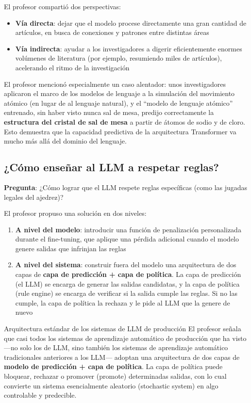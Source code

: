 \documentclass[a4paper]{article}
\begin{document}
El profesor compartió dos perspectivas:
\begin{itemize}
    \item \textbf{Vía directa}: dejar que el modelo procese directamente una gran cantidad de artículos, en busca de conexiones y patrones entre distintas áreas
    \item \textbf{Vía indirecta}: ayudar a los investigadores a digerir eficientemente enormes volúmenes de literatura (por ejemplo, resumiendo miles de artículos), acelerando el ritmo de la investigación
\end{itemize}

El profesor mencionó especialmente un caso alentador: unos investigadores aplicaron el marco de los modelos de lenguaje a la simulación del movimiento atómico (en lugar de al lenguaje natural), y el ``modelo de lenguaje atómico'' entrenado, sin haber visto nunca sal de mesa, predijo correctamente la \textbf{estructura del cristal de sal de mesa} a partir de átomos de sodio y de cloro. Esto demuestra que la capacidad predictiva de la arquitectura Transformer va mucho más allá del dominio del lenguaje.

\subsection{¿Cómo enseñar al LLM a respetar reglas?}

\textbf{Pregunta}: ¿Cómo lograr que el LLM respete reglas específicas (como las jugadas legales del ajedrez)?

El profesor propuso una solución en dos niveles:

\begin{enumerate}
    \item \textbf{A nivel del modelo}: introducir una función de penalización personalizada durante el fine-tuning, que aplique una pérdida adicional cuando el modelo genere salidas que infrinjan las reglas
    \item \textbf{A nivel del sistema}: construir fuera del modelo una arquitectura de dos capas de \textbf{capa de predicción + capa de política}. La capa de predicción (el LLM) se encarga de generar las salidas candidatas, y la capa de política (rule engine) se encarga de verificar si la salida cumple las reglas. Si no las cumple, la capa de política la rechaza y le pide al LLM que la genere de nuevo
\end{enumerate}

\begin{knowledgebox}{Arquitectura estándar de los sistemas de LLM de producción}
El profesor señala que casi todos los sistemas de aprendizaje automático de producción que ha visto —no solo los de LLM, sino también los sistemas de aprendizaje automático tradicionales anteriores a los LLM— adoptan una arquitectura de dos capas de \textbf{modelo de predicción + capa de política}. La capa de política puede bloquear, rechazar o promover (promote) determinadas salidas, con lo cual convierte un sistema esencialmente aleatorio (stochastic system) en algo controlable y predecible.
\end{knowledgebox}
\end{document}
